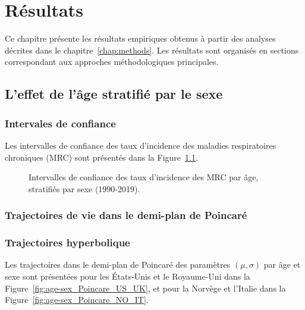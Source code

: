 \chapter{Résultats}
\label{chap:results}
Ce chapitre présente les résultats empiriques obtenus à partir des analyses décrites dans le chapitre~\ref{chap:methods}. Les résultats sont organisés en sections correspondant aux approches méthodologiques principales.

\section{L'effet de l'âge stratifié par le sexe}

\subsection{Intervales de confiance}
Les intervalles de confiance des taux d'incidence des maladies respiratoires chroniques (MRC) sont présentés dans la Figure~\ref{fig:CI-age-sex}.
\begin{figure}[H]
	\centering
	\caption{Intervalles de confiance des taux d'incidence des MRC par âge, stratifiés par sexe (1990-2019).}
	\label{fig:CI-age-sex}
\end{figure}

\subsection{Trajectoires de vie dans le demi-plan de Poincaré}
\subsection{Trajectoires hyperbolique}
Les trajectoires dans le demi-plan de Poincaré des paramètres \((\mu, \sigma)\) par âge et sexe sont présentées pour les États-Unis et le Royaume-Uni dans la Figure~\ref{fig:age-sex_Poincare_US_UK}, et pour la Norvège et l'Italie dans la Figure~\ref{fig:age-sex_Poincare_NO_IT}.

